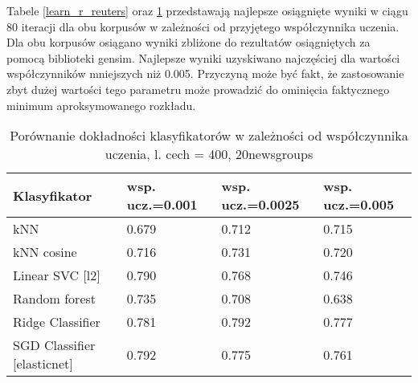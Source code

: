 \documentclass{pracamgr}
\begin{document}
Tabele \ref{learn_r_reuters} oraz \ref{news_learn_r} przedstawają najlepsze osiągnięte wyniki w ciągu 80 iteracji dla obu korpusów w zależności od przyjętego współczynnika uczenia. Dla obu korpusów osiągano wyniki zbliżone do rezultatów osiągniętych za pomocą biblioteki gensim. Najlepsze wyniki uzyskiwano najczęściej dla wartości współczynników mniejszych niż 0.005. Przyczyną może być fakt, że zastosowanie zbyt dużej wartości tego parametru może prowadzić do ominięcia faktycznego minimum aproksymowanego rozkładu.

\begin{table}[]
\centering
{}
\caption{Porównanie dokładności klasyfikatorów w zależności od współczynnika uczenia, l. cech = 300, Reuters}
\label{learn_r_reuters}
\end{table}

\begin{table}[]
\centering
\begin{tabular}{@{}llll@{}}
\toprule
Klasyfikator                             & wsp. ucz.=0.001 & wsp. ucz.=0.0025 & wsp. ucz.=0.005 \\ \midrule
kNN                             & 0.679          & 0.712           & 0.715          \\
kNN cosine                      & 0.716          & 0.731           & 0.720          \\
Linear SVC {[}l2{]}             & 0.790          & 0.768           & 0.746          \\
Random forest                   & 0.735          & 0.708           & 0.638          \\
Ridge Classifier                & 0.781          & 0.792           & 0.777          \\
SGD Classifier {[}elasticnet{]} & 0.792          & 0.775           & 0.761          \\ \bottomrule
\end{tabular}
\caption{Porównanie dokładności klasyfikatorów w zależności od współczynnika uczenia, l. cech = 400, 20newsgroups}
\label{news_learn_r}
\end{table}
\end{document}
